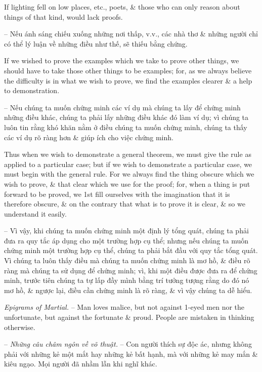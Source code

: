 \documentclass{article}
\begin{document}
\begin{enumerate}
\begin{itemize}
		 If lighting fell on low places, etc., poets, \& those who can only reason about things of that kind, would lack proofs.
		
		-- Nếu ánh sáng chiếu xuống những nơi thấp, v.v., các nhà thơ \& những người chỉ có thể lý luận về những điều như thế, sẽ thiếu bằng chứng.
		
		 If we wished to prove the examples which we take to prove other things, we should have to take those other things to be examples; for, as we always believe the difficulty is in what we wish to prove, we find the examples clearer \& a help to demonstration.
		
		-- Nếu chúng ta muốn chứng minh các ví dụ mà chúng ta lấy để chứng minh những điều khác, chúng ta phải lấy những điều khác đó làm ví dụ; vì chúng ta luôn tin rằng khó khăn nằm ở điều chúng ta muốn chứng minh, chúng ta thấy các ví dụ rõ ràng hơn \& giúp ích cho việc chứng minh.
		
		Thus when we wish to demonstrate a general theorem, we must give the rule as applied to a particular case; but if we wish to demonstrate a particular case, we must begin with the general rule. For we always find the thing obscure which we wish to prove, \& that clear which we use for the proof; for, when a thing is put forward to be proved, we 1st fill ourselves with the imagination that it is therefore obscure, \& on the contrary that what is to prove it is clear, \& so we understand it easily.
		
		-- Vì vậy, khi chúng ta muốn chứng minh một định lý tổng quát, chúng ta phải đưa ra quy tắc áp dụng cho một trường hợp cụ thể; nhưng nếu chúng ta muốn chứng minh một trường hợp cụ thể, chúng ta phải bắt đầu với quy tắc tổng quát. Vì chúng ta luôn thấy điều mà chúng ta muốn chứng minh là mơ hồ, \& điều rõ ràng mà chúng ta sử dụng để chứng minh; vì, khi một điều được đưa ra để chứng minh, trước tiên chúng ta tự lấp đầy mình bằng trí tưởng tượng rằng do đó nó mơ hồ, \& ngược lại, điều cần chứng minh là rõ ràng, \& vì vậy chúng ta dễ hiểu.
		
		 {\it Epigrams of Martial.} -- Man loves malice, but not against 1-eyed men nor the unfortunate, but against the fortunate \& proud. People are mistaken in thinking otherwise.
		
		-- {\it Những câu châm ngôn về võ thuật.} -- Con người thích sự độc ác, nhưng không phải với những kẻ một mắt hay những kẻ bất hạnh, mà với những kẻ may mắn \& kiêu ngạo. Mọi người đã nhầm lẫn khi nghĩ khác.
		

\end{itemize}
\end{enumerate}
\end{document}
